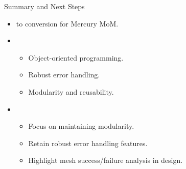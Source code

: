 %  
%  
%  
%  

\begin{frame}{Summary and Next Steps}
    \begin{itemize}
        \item {}  to  conversion for Mercury MoM.
        \item {} 
            \begin{itemize}
                \item Object-oriented programming.
                \item Robust error handling.
                \item Modularity and reusability.
            \end{itemize}
        \item {}
            \begin{itemize}
                \item Focus on maintaining modularity.
                \item Retain robust error handling features.
                \item Highlight mesh success/failure analysis in design.
            \end{itemize}
    \end{itemize}
\end{frame}

